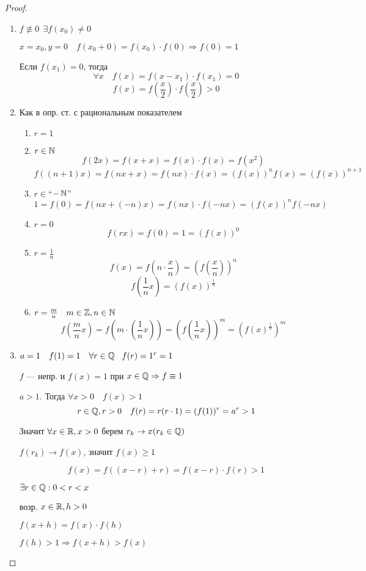 \begin{proof}
    \begin{enumerate}
        \item $f\not\equiv 0 \ \ \exists f(x_0)\not=0$

        $x=x_0, y=0 \quad f(x_0+0)=f(x_0)\cdot f(0)\Rightarrow f(0)=1$

        Если $f(x_1)=0$, тогда $$\forall x \quad f(x)=f(x-x_1)\cdot f(x_1) = 0$$
        $$f(x)=f\left(\frac{x}{2}\right)\cdot f\left(\frac{x}{2}\right)>0$$

        \item Как в опр. ст. с рациональным показателем
        \begin{enumerate}
            \item $r=1$
            \item $r\in\operatorname*{\mathbb{N}}$
            $$f(2x)=f(x+x)=f(x)\cdot f(x) = f(x^2)$$
            $$f((n+1)x)=f(nx+x)=f(nx)\cdot f(x)=(f(x))^nf(x)=(f(x))^{n+1}$$
            \item $r\in$``$-\operatorname*{\mathbb{N}}$''
            $$1=f(0)=f(nx+(-n)x)=f(nx)\cdot f(-nx)=(f(x))^nf(-nx)$$
            \item $r=0$
            $$f(rx)=f(0)=1=(f(x))^0$$
            \item $r=\frac{1}{n}$
            $$f(x)=f(n\cdot\frac{x}{n})=(f(\frac{x}{n}))^n$$
            $$f(\frac{1}{n}x)=(f(x))^{\frac{1}{n}}$$
            \item $r=\frac{m}{n} \quad m\in\operatorname*{\mathbb{Z}}, n\in\operatorname*{\mathbb{N}}$
            $$f(\frac{m}{n}x)=f(m\cdot(\frac{1}{n}x))=(f(\frac{1}{n}x))^m=(f(x)^{\frac{1}{n}})^m$$
        \end{enumerate}
        \item $a=1 \quad f(1)=1 \quad \forall r\in\operatorname*{\mathbb{Q}} \ \ f(r)=1^r=1$
        
        $f$ --- непр. и $f(x)=1$ при $x\in\operatorname*{\mathbb{Q}}\Rightarrow f\equiv1$

        $a>1$. Тогда $\forall x>0 \quad f(x)>1$
        $$r\in\operatorname*{\mathbb{Q}}, r>0 \quad f(r)=r(r\cdot 1)=(f(1))^r=a^r>1$$

        Значит $\forall x\in\operatorname*{\mathbb{R}}, x>0$ берем $r_k\to x (r_k\in\operatorname*{\mathbb{Q}})$

        $f(r_k)\to f(x)$, значит $f(x)\geq 1$

        $$f(x)=f((x-r)+r)=f(x-r)\cdot f(r)>1$$

        $\exists r\in\operatorname*{\mathbb{Q}} : 0<r<x$

        возр. $x\in\operatorname*{\mathbb{R}}, h>0$

        $f(x+h)=f(x)\cdot f(h)$

        $f(h)>1 \Rightarrow f(x+h)>f(x)$


\end{enumerate}
\end{proof}

